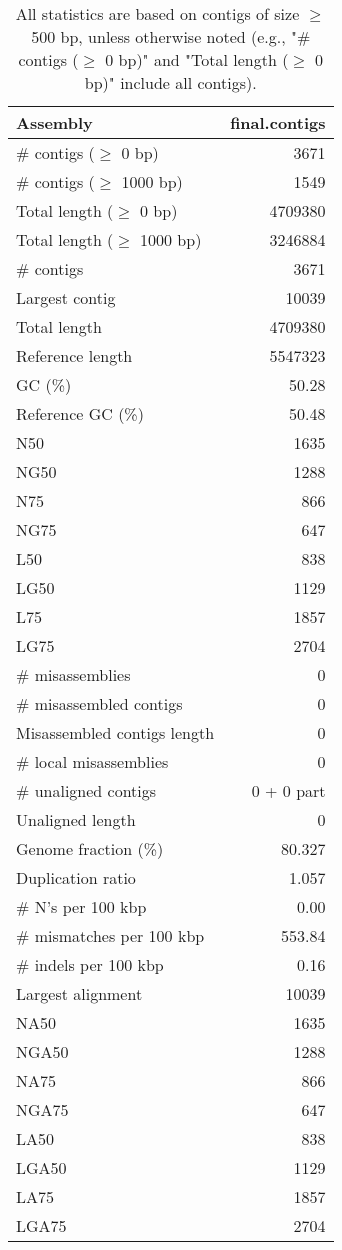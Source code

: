 \documentclass[12pt,a4paper]{article}
\begin{document}
\begin{table}[ht]
\begin{center}
\caption{All statistics are based on contigs of size $\geq$ 500 bp, unless otherwise noted (e.g., "\# contigs ($\geq$ 0 bp)" and "Total length ($\geq$ 0 bp)" include all contigs).}
\begin{tabular}{|l*{1}{|r}|}
\hline
Assembly & final.contigs \\ \hline
\# contigs ($\geq$ 0 bp) & 3671 \\ \hline
\# contigs ($\geq$ 1000 bp) & 1549 \\ \hline
Total length ($\geq$ 0 bp) & 4709380 \\ \hline
Total length ($\geq$ 1000 bp) & 3246884 \\ \hline
\# contigs & 3671 \\ \hline
Largest contig & 10039 \\ \hline
Total length & 4709380 \\ \hline
Reference length & 5547323 \\ \hline
GC (\%) & 50.28 \\ \hline
Reference GC (\%) & 50.48 \\ \hline
N50 & 1635 \\ \hline
NG50 & 1288 \\ \hline
N75 & 866 \\ \hline
NG75 & 647 \\ \hline
L50 & 838 \\ \hline
LG50 & 1129 \\ \hline
L75 & 1857 \\ \hline
LG75 & 2704 \\ \hline
\# misassemblies & 0 \\ \hline
\# misassembled contigs & 0 \\ \hline
Misassembled contigs length & 0 \\ \hline
\# local misassemblies & 0 \\ \hline
\# unaligned contigs & 0 + 0 part \\ \hline
Unaligned length & 0 \\ \hline
Genome fraction (\%) & 80.327 \\ \hline
Duplication ratio & 1.057 \\ \hline
\# N's per 100 kbp & 0.00 \\ \hline
\# mismatches per 100 kbp & 553.84 \\ \hline
\# indels per 100 kbp & 0.16 \\ \hline
Largest alignment & 10039 \\ \hline
NA50 & 1635 \\ \hline
NGA50 & 1288 \\ \hline
NA75 & 866 \\ \hline
NGA75 & 647 \\ \hline
LA50 & 838 \\ \hline
LGA50 & 1129 \\ \hline
LA75 & 1857 \\ \hline
LGA75 & 2704 \\ \hline
\end{tabular}
\end{center}
\end{table}
\end{document}
